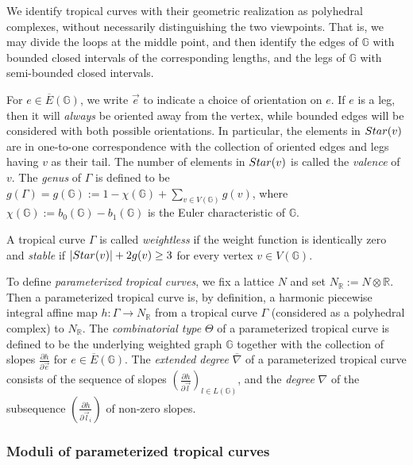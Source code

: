 \documentclass[11pt,reqno]{amsart}
\numberwithin{equation}{section}
\theoremstyle{definition}
\newcommand{\RR}{{\mathbb R}}
\newcommand{\GG}{{\mathbb G}}
\newcommand{\Star}{{\rm Star}}
\theoremstyle{remark}
\begin{document}
We identify tropical curves with their geometric realization as polyhedral complexes, without necessarily distinguishing the two viewpoints. That is, we may divide the loops at the middle point, and then identify the edges of $\GG$ with bounded closed intervals of the corresponding lengths, and the legs of $\GG$ with semi-bounded closed intervals.

For $e\in\overline E(\GG)$, we write $\vec e$ to indicate a choice of orientation on $e$. If $e$ is a leg, then it will {\em always} be oriented away from the vertex, while bounded edges will be considered with both possible orientations. 
In particular, the elements in $\Star(v)$ are in one-to-one correspondence with the collection of oriented edges and legs having $v$ as their tail.
The number of elements in $\Star(v)$ is called the {\em valence} of $v$. The {\em genus} of $\Gamma$ is defined to be $g(\Gamma) = g(\GG) :=1-\chi(\mathbb G)+\sum_{v\in V(\mathbb G)}g(v)$, where $\chi(\GG):=b_0(\GG)-b_1(\GG)$ is the Euler characteristic of $\GG$. 

A tropical curve $\Gamma$ is called {\em weightless} if the weight function is identically zero and {\em stable} if $|\Star(v)|+ 2 g(v)\ge 3$ for every vertex $v\in V(\GG)$.

To define {\em parameterized tropical curves}, we fix a lattice $N$ and set $N_\RR:=N\otimes\RR$. 
Then a parameterized tropical curve is, by definition, a harmonic piecewise integral affine map $h\colon \Gamma\rightarrow N_\mathbb R$ from a tropical curve $\Gamma$ (considered as a polyhedral complex) to $N_\mathbb R$. 
The {\em combinatorial type} $\Theta$ of a parameterized tropical curve is defined to be the underlying weighted graph $\mathbb G$ together with the collection of slopes $\frac{\partial h}{\partial \vec e}$ for $e \in \overline E(\GG)$.
The {\em extended degree} $\overline\nabla$ of a parameterized tropical curve consists of the sequence of slopes $\left(\frac{\partial h}{\partial \vec l}\right)_{l\in L(\GG)}$, and the {\em degree} $\nabla$ of the subsequence $\left(\frac{\partial h}{\partial \vec l_i}\right)$ of non-zero slopes.


\subsubsection{Moduli of parameterized tropical curves}\label{subsec:modulioftrcr}
\end{document}
